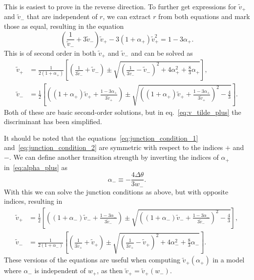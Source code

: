 This is easiest to prove in the reverse direction.
To further get expressions for $\tilde{v}_+$ and $\tilde{v}_-$ that are independent of $r$, we can extract $r$ from both equations and mark those as equal, resulting in the equation
\begin{equation}
\left( \frac{1}{\tilde{v}_-} + 3 \tilde{v}_- \right) \tilde{v}_+ - 3(1+\alpha_+)\tilde{v}_+^2 = 1 - 3\alpha_+.
\end{equation}
This is of second order in both $\tilde{v}_+$ and $\tilde{v}_-$ and can be solved as \cite[eq. B.6, B.7]{hindmarsh_gw_pt_2019}
\begin{align}
\tilde{v}_+ &= \frac{1}{2(1+\alpha_+)}\left[ \left(\frac{1}{3\tilde{v}_-}+\tilde{v}_-\right) \pm \sqrt{\left(\frac{1}{3\tilde{v}_-} - \tilde{v}_- \right)^2 + 4\alpha_+^2 + \frac{8}{3} \alpha_+} \right],
\label{eq:v_tilde_plus}
\\
\tilde{v}_- &= \frac{1}{2} \left[ \left( (1+\alpha_+)\tilde{v}_+ + \frac{1-3\alpha_+}{3\tilde{v}_+} \right) \pm \sqrt{\left((1+\alpha_+)\tilde{v}_+ + \frac{1-3\alpha_+}{3\tilde{v}_+} \right)^2 - \frac{4}{3}} \right].
\label{eq:v_tilde_minus}
\end{align}
Both of these are basic second-order solutions, but in eq.~\eqref{eq:v_tilde_plus} the discriminant has been simplified.

It should be noted that the equations~\eqref{eq:junction_condition_1} and~\eqref{eq:junction_condition_2} are symmetric with respect to the indices $+$ and $-$.
We can define another transition strength by inverting the indices of $\alpha_+$ in~\eqref{eq:alpha_plus} as
\begin{equation}
\alpha_- \equiv - \frac{4 \Delta \theta}{3 w_-}.
\end{equation}
With this we can solve the junction conditions as above, but with opposite indices, resulting in
\begin{align}
\tilde{v}_+ &= \frac{1}{2} \left[ \left( (1+\alpha_-)\tilde{v}_- + \frac{1-3\alpha_-}{3\tilde{v}_-} \right) \pm \sqrt{\left((1+\alpha_-)\tilde{v}_- + \frac{1-3\alpha_-}{3\tilde{v}_-} \right)^2 - \frac{4}{3}} \right],
\label{eq:v_tilde_plus_reverse}
\\
\tilde{v}_- &= \frac{1}{2(1+\alpha_-)}\left[ \left(\frac{1}{3\tilde{v}_+}+\tilde{v}_+\right) \pm \sqrt{\left(\frac{1}{3\tilde{v}_+} - \tilde{v}_+ \right)^2 + 4\alpha_-^2 + \frac{8}{3} \alpha_-} \right].
\label{eq:v_tilde_minus_reverse}
\end{align}
These versions of the equations are useful when computing $\tilde{v}_+(\alpha_+)$ in a model where $\alpha_-$ is independent of $w_+$, as then $\tilde{v}_+ = \tilde{v}_+(w_-)$.


